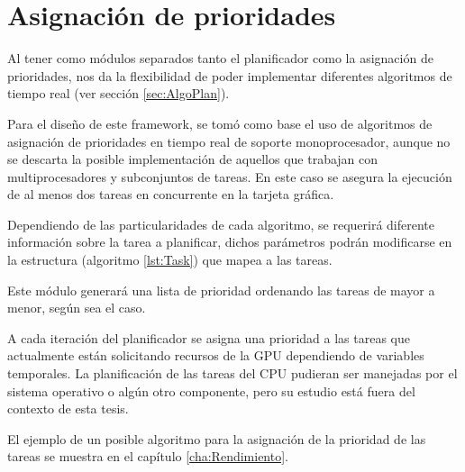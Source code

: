 \section{Asignación de prioridades} \label{secc:asigPrioridad}

Al tener como módulos separados tanto el planificador como la asignación de prioridades, nos da la flexibilidad de poder implementar diferentes algoritmos de tiempo real (ver sección \ref{sec:AlgoPlan}).
\newline

Para el diseño de este framework, se tomó como base el uso de algoritmos de asignación de prioridades en tiempo real de soporte monoprocesador, aunque no se descarta la posible implementación de aquellos que trabajan con multiprocesadores y subconjuntos de tareas. En este caso se asegura la ejecución de al menos dos tareas en concurrente en la tarjeta gráfica.

Dependiendo de las particularidades de cada algoritmo, se requerirá diferente información sobre la tarea a planificar, dichos parámetros podrán modificarse en la estructura (algoritmo \ref{lst:Task}) que mapea a las tareas.
\newline

Este módulo generará una lista de prioridad ordenando las tareas de mayor a menor, según sea el caso.

A cada iteración del planificador se asigna una prioridad a las tareas que actualmente están solicitando recursos de la GPU dependiendo de variables temporales. La planificación de las tareas del CPU pudieran ser manejadas por el sistema operativo o algún otro componente, pero su estudio está fuera del contexto de esta tesis.
\newline

El ejemplo de un posible algoritmo para la asignación de la prioridad de las tareas se muestra en el capítulo \ref{cha:Rendimiento}.